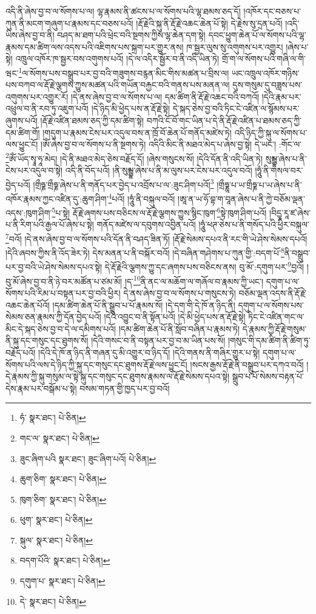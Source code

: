 འདི་ནི་ཞེས་བྱ་བ་ལ་སོགས་པ་ལ། ལྷ་རྣམས་ནི་ཚངས་པ་ལ་སོགས་པའི་ལྷ་ཐམས་ཅད་དོ། །འཁོར་དང་བཅས་པ་ཀུན་ནི་མངག་གཞུག་པ་རྣམས་དང་བཅས་པའོ། །རྡོ་རྗེའི་སྐུ་ནི་རྡོ་རྗེ་འཆང་ཆེན་པོ་སྟེ། དེ་རྗེས་སུ་དྲན་པའོ། །འདི་ཡིས་ཞེས་བྱ་བ་ནི། བཤད་མ་ཐག་པའི་ཕྲེང་བའི་སྔགས་ཀྱིས་ལྷ་ཆེན་དག་སྟེ། དབང་ཕྱུག་ཆེན་པོ་ལ་སོགས་པའི་ལྷ་རྣམས་དམ་ཚིག་ལས་འདས་པའི་འཇིགས་པས་སྐྲག་པར་གྱུར་ནས། ཁ་སྦྱར་ལུས་སུ་འགུགས་པར་འགྱུར། །ཞེས་པ་སྟེ། འཁྲུལ་འཁོར་ཁ་སྦྱར་བས་འགུགས་པའོ། །དེ་ལ་འདིར་སྦྱོར་བ་ནི་འདི་ཡིན་ཏེ། གྲོ་ག་ལ་སོགས་པའི་གཞི་ལ་གི་ཝང་\footnote{ཧཾ་  སྣར་ཐང་།  པེ་ཅིན། }ལ་སོགས་པས་བསྒྲུབ་པར་བྱ་བའི་གཟུགས་བརྙན་མིང་གིས་མཚན་པ་བྲིས་ལ། ཡང་འཁྲུལ་འཁོར་གཉིས་པས་བཀབ་ལ་རྡོ་རྗེ་ལྕགས་ཀྱུས་མཚན་པའི་གཡོན་བརྐྱང་བའི་གནས་པས་མནན་ལ། དུས་གསུམ་དུ་བཟླས་པས་འགུགས་པར་འགྱུར་རོ། །དེ་ནས་ཞེས་བྱ་བ་ལ་སོགས་པ་ལ། དམ་ཚིག་ནི་རྡོ་རྗེ་འཆང་བའི་བཀའོ། །དེའི་རྣམ་པར་འཕྲུལ་བ་ནི་རབ་ཏུ་འཇུག་པའོ། །དེ་ཉིད་མི་ཕྱེད་པས་ན་རྡོ་རྗེ་སྟེ། དེ་སྐད་ཅེས་བྱ་བའི་ཏིང་ངེ་འཛིན་ལ་སྙོམས་པར་ཞུགས་པའོ། །རྡོ་རྗེ་འཛིན་ཐམས་ཅད་ཀྱི་དམ་ཚིག་སྟེ། བཀའི་ངོ་བོ་གང་ཡིན་པ་དེ་ནི་རྡོ་རྗེ་འཛིན་པ་ཐམས་ཅད་ཀྱི་དམ་ཚིག་གོ། །གདུག་པ་རྣམས་ངེས་པར་འདུལ་བས་ན་ཁྲོ་བོ་ཆེན་པོ་གནོད་མཛེས་ཏེ། འདི་ཉིད་ཀྱི་སྐུ་ལ་སོགས་པ་ལས་ཕྱུང་ངོ། །ཨོཾ་ཞེས་བྱ་བ་ལ་སོགས་པ་ནི་སྔགས་ཏེ། འདིའི་མིང་ནི་མཐའ་མེད་པ་ཞེས་བྱ་སྟེ། དེ་ཡང་། :གོང་ལ་\footnote{གང་ལ་  སྣར་ཐང་།  པེ་ཅིན། }ཨོཾ་ཡོད་སྭཱ་ཧཱ་མེད། །དེ་ནི་མཐའ་མེད་ཅེས་བརྗོད་དོ། །ཞེས་གསུངས་སོ། །དེའི་དོན་ནི་འདི་ཡིན་ཏེ། སུམྦྷ་ཞེས་པ་ནི་ངེས་པར་འདུལ་བ་སྟེ། འདི་ནི་བོད་པའོ། །ནི་སུམྦྷ་ཞེས་པ་ནི་མ་ལུས་པར་ངེས་པར་འདུལ་བའོ། །ཧཱུཾ་ནི་གསལ་བར་བྱེད་པའོ། །གྲྀཧྞ་གྲྀཧྞ་ཞེས་པ་ནི་གནོད་པར་བྱེད་པ་འབྲོས་པ་ལ་:ཟུང་ཤིག་པའོ།\footnote{ཟུང་ཞིག་པའི  སྣར་ཐང་། ཟུང་ཞིག་པའོ།  པེ་ཅིན། } །གྲྀཧྞཱ་པ་ཡ་གྲྀཧྞ་པ་ཡ་ཞེས་པ་ནི་འཁོར་རྣམས་ཀྱང་འཛིན་དུ་:ཆུག་ཤིག་\footnote{ཆུག་ཅིག་  སྣར་ཐང་།  པེ་ཅིན། }པའོ། །ཧཱུཾ་ནི་བསྐུལ་བའོ། །ཨཱ་ན་ཡ་ཧོ་བྷ་ག་བཱན་ཞེས་པ་ནི་ཀྱེ་བཅོམ་ལྡན་འདས་:ཁུག་ཤིག་\footnote{ཁུག་ཅིག་  སྣར་ཐང་།  པེ་ཅིན། }པ་སྟེ། རྡོ་རྗེ་ཞགས་པས་བཅིངས་ལ་རྡོ་རྗེ་ལྕགས་ཀྱུས་སྙིང་ཁུག་\footnote{ཕུག་  སྣར་ཐང་།  པེ་ཅིན། }སྟེ་ཁུག་ཤིག་པའོ། །བིདྱཱ་རཱ་ཛ་ཞེས་པ་ནི་རིག་པའི་རྒྱལ་པོ་ཞེས་པ་སྟེ། གནོད་མཛེས་ལ་དབུགས་འབྱིན་པའོ། །ཧཱུཾ་ཕཊ་ཅེས་པ་ནི་གསོད་པའི་ཕྱིར་བསྐུལ་\footnote{སྐུལ་  སྣར་ཐང་།  པེ་ཅིན། }བའོ། །དེ་ནས་ཞེས་བྱ་བ་ལ་སོགས་པའི་དོན་ནི་བཤད་ཟིན་ཏོ། །རྡོ་རྗེ་སེམས་དཔའ་ནི་རང་གི་ཡེ་ཤེས་སེམས་དཔའོ། །དེའི་ཞབས་ཀྱིས་ནི་འོད་ཟེར་ཏེ། དེས་མནན་པ་ནི་བསྐོར་བའོ། །དེ་བཞིན་གཤེགས་པ་ཀུན་གྱི་:བདག་པོ་\footnote{བདག་པོའི་  སྣར་ཐང་།  པེ་ཅིན། }ནི་བསྒྲུབ་པར་བྱ་བའི་ཡེ་ཤེས་སེམས་དཔའ་སྟེ། དེ་རྡོ་རྗེའི་ལྕགས་ཀྱུ་དང་ཞགས་པས་བཅིངས་ནས། བུ་མོ་:དགུག་པར་\footnote{དགུག་པ་  སྣར་ཐང་།  པེ་ཅིན། }བྱའོ། །བུ་མོ་ཞེས་བྱ་བ་ནི་ཉེ་བར་མཚོན་པ་ཙམ་མོ། །ད་\footnote{དེ་  སྣར་ཐང་།  པེ་ཅིན། }ནི་ནང་ལ་མཆོག་ལ་གཞོལ་བ་རྣམས་ཀྱི་ཡང་། དགུག་པ་ལ་སོགས་པའི་རིམ་པ་བསྟན་པར་བྱ་བའི་ཕྱིར། དེ་ནས་ཞེས་བྱ་བ་ལ་སོགས་པ་གསུངས་ཏེ། བཅོམ་ལྡན་འདས་ནི་རྡོ་རྗེ་འཆང་ཆེན་པོའོ། །དམ་ཚིག་ཆེན་པོ་ནི་སྒྲུབ་པ་པོ་རྣམས་སོ། །དེ་དག་གི་དེ་ཁོ་ན་ཉིད་ནི། དགུག་པ་ལ་སོགས་པས་སེམས་ཅན་རྣམས་ཀྱི་དོན་བྱེད་པའོ། །དེའི་འབྱུང་བ་ནི་སྟོན་པའོ། །དེ་མི་ཕྱེད་པས་ན་རྡོ་རྗེ་སྟེ། ཏིང་ངེ་འཛིན་གང་ལ་མིང་དེ་སྐད་ཅེས་བྱ་བ་དེ་ལ་དམིགས་པའོ། །དམ་ཚིག་ཆེན་པོ་ནི་སློབ་བཞིན་པ་རྣམས་ཏེ། དེ་རྣམས་ཀྱི་རྡོ་རྗེ་གསུམ་ནི་སྐུ་དང་གསུང་དང་ཐུགས་སོ། །དེའི་གསང་བ་ནི་བསྟན་པར་བྱ་བ་མ་ཡིན་པས་སོ། །གསུང་གི་དམ་ཚིག་ནི་ཚིག་ཏུ་བརྗོད་པའོ། །དེའི་དེ་ཁོ་ན་ཉིད་ནི་གཞན་དུ་མི་འགྱུར་བ་ཉིད་དོ། །དེའི་གནས་ནི་གཞིར་གྱུར་པ་སྟེ། དགུག་པ་ལ་སོགས་པའི་ལས་དེ་ཉིད་ཀྱི་སྐུ་དང་གསུང་དང་ཐུགས་རྡོ་རྗེ་ལས་ཕྱུང་ངོ། །སངས་རྒྱས་རྡོ་རྗེ་ནི་བསྒྲུབ་པར་དཀའ་བའོ། །དེ་རྣམས་ཀྱི་སྐུ་གསུམ་ལ་སྟེ་སྐུ་དང་གསུང་དང་ཐུགས་རྣམས་ལ་རྡོ་རྗེ་སེམས་དཔའ་སྟེ། སྒྲུབ་པ་པོ་སེམས་བརྟན་པོ་དེས་རྣམ་པར་བསྒོམ་པ་སྟེ། བསམ་གཏན་གྱི་ཁྱད་པར་བྱ་བའོ། 